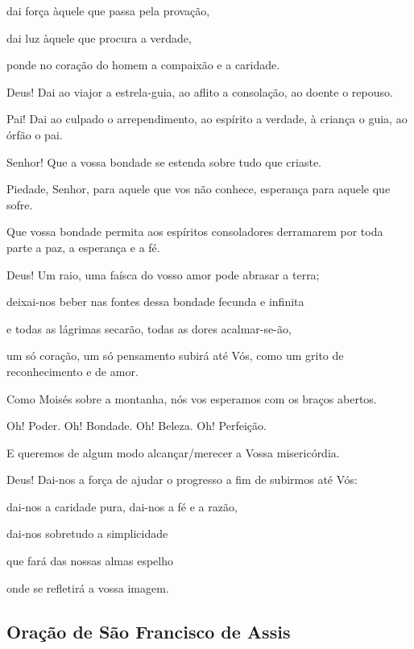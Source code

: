 \documentclass[12pt,a4paper]{article}
\begin{document}
			dai for\c{c}a \`aquele que passa pela prova\c{c}\~ao,

			dai luz \`aquele que procura a verdade,

			ponde no cora\c{c}\~ao do homem a compaix\~ao e a caridade.

			Deus! Dai ao viajor a estrela-guia, ao aflito a consola\c{c}\~ao, ao doente o repouso.

			Pai! Dai ao culpado o arrependimento, ao esp\'irito a verdade, \`a crian\c{c}a o guia, ao \'orf\~ao o pai.

			Senhor! Que a vossa bondade se estenda sobre tudo que criaste.

			Piedade, Senhor, para aquele que vos n\~ao conhece, esperan\c{c}a para aquele que sofre.

			Que vossa bondade permita aos esp\'iritos consoladores derramarem por toda parte a paz, a esperan\c{c}a e a f\'e.

			Deus! Um raio, uma fa\'isca do vosso amor pode abrasar a terra;

			deixai-nos beber nas fontes dessa bondade fecunda e infinita

			e todas as l\'agrimas secar\~ao, todas as dores acalmar-se-\~ao,

			um s\'o cora\c{c}\~ao, um s\'o pensamento subir\'a at\'e V\'os, como um grito de reconhecimento e de amor.

			Como Mois\'es sobre a montanha, n\'os vos esperamos com os bra\c{c}os abertos.

			Oh! Poder. Oh! Bondade. Oh! Beleza. Oh! Perfei\c{c}\~ao.

			E queremos de algum modo alcan\c{c}ar/merecer a Vossa miseric\'ordia.

			Deus! Dai-nos a for\c{c}a de ajudar o progresso a fim de subirmos at\'e V\'os:

			dai-nos a caridade pura, dai-nos a f\'e e a raz\~ao,

			dai-nos sobretudo a simplicidade

			que far\'a das nossas almas espelho

			onde se refletir\'a a vossa imagem.

		\subsection{Ora\c{c}\~ao de S\~ao Francisco de Assis}
			\begin{flushright}
			\end{flushright}
\end{document}
